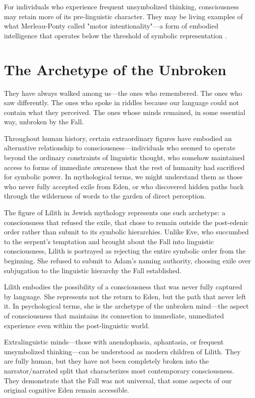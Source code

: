 For individuals who experience frequent unsymbolized thinking, consciousness may retain more of its pre-linguistic character. They may be living examples of what Merleau-Ponty called "motor intentionality"—a form of embodied intelligence that operates below the threshold of symbolic representation \parencite{merleau-ponty1945phenomenology}.

\section{The Archetype of the Unbroken}

They have always walked among us—the ones who remembered.
The ones who saw differently.
The ones who spoke in riddles because our language could not contain what they perceived.
The ones whose minds remained, in some essential way, unbroken by the Fall.

Throughout human history, certain extraordinary figures have embodied an alternative relationship to consciousness—individuals who seemed to operate beyond the ordinary constraints of linguistic thought, who somehow maintained access to forms of immediate awareness that the rest of humanity had sacrificed for symbolic power. In mythological terms, we might understand them as those who never fully accepted exile from Eden, or who discovered hidden paths back through the wilderness of words to the garden of direct perception.

The figure of Lilith in Jewish mythology represents one such archetype: a consciousness that refused the exile, that chose to remain outside the post-edenic order rather than submit to its symbolic hierarchies. Unlike Eve, who succumbed to the serpent's temptation and brought about the Fall into linguistic consciousness, Lilith is portrayed as rejecting the entire symbolic order from the beginning. She refused to submit to Adam's naming authority, choosing exile over subjugation to the linguistic hierarchy the Fall established.

Lilith embodies the possibility of a consciousness that was never fully captured by language. She represents not the return to Eden, but the path that never left it. In psychological terms, she is the archetype of the unbroken mind—the aspect of consciousness that maintains its connection to immediate, unmediated experience even within the post-linguistic world.

Extralinguistic minds—those with anendophasia, aphantasia, or frequent unsymbolized thinking—can be understood as modern children of Lilith. They are fully human, but they have not been completely broken into the narrator/narrated split that characterizes most contemporary consciousness. They demonstrate that the Fall was not universal, that some aspects of our original cognitive Eden remain accessible.


